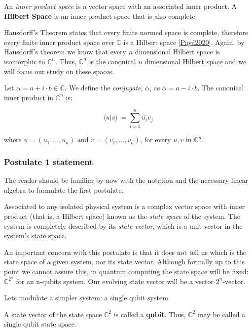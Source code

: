 \begin{definition}
	An \emph{inner product space} is a vector space with an associated inner product. A \textbf{Hilbert Space} is an inner product space that is also complete.
\end{definition}

Hausdorff's Theorem states that every finite normed space is complete, therefore every finite inner product space over $\mathds{C}$ is a Hilbert space \ref{Payá2020}. Again, by Hausdorff's theorem we know that every $n$ dimensional Hilbert space is isomorphic to $\mathds{C}^n$. Thus, $\mathds{C}^n$ is the canonical $n$ dimensional Hilbert space and we will focus our study on these spaces.

Let $\alpha = a + i \cdot b\in \mathds{C}$. We define the \emph{conjugate}, $\bar \alpha$, as $\bar \alpha = a - i \cdot b$. The canonical inner product in $\mathds{C}^n$ is:

$$ \langle u|v \rangle \ = \sum_{i=1}^n \overline{u_i}v_j $$

where $u = (u_1, \dotsc, u_n)$ and $v = (v_1, \dotsc, v_n)$, for every $u,v$ in $\mathds{C}^n$.


\subsubsection{Postulate 1 statement}


The reader should be familiar by now with the notation and the necessary linear algebra to formulate the first postulate.

\begin{postulate}
	Associated to any isolated physical system is a complex vector space with inner product (that is, a Hilbert space) known as the \emph{state space} of the system. The system is completely described by its \emph{state vector}, which is a unit vector in the system’s state space.
\end{postulate}

An important concern with this postulate is that it does not tell us which is the state space of a given system, nor its state vector. Although formally up to this point we cannot assure this, in quantum computing the state space will be fixed: $\mathds{C}^{2^n}$ for an n-qubits system. Our evolving state vector will be a vector $2^n$-vector.

Lets modulate a simpler system: a single qubit system.

\begin{definition}
	A state vector of the state space $\mathds{C}^{2}$ is called a \textbf{qubit}. Thus, $\mathds{C}^{2}$ may be called a single qubit state space.
\end{definition}

